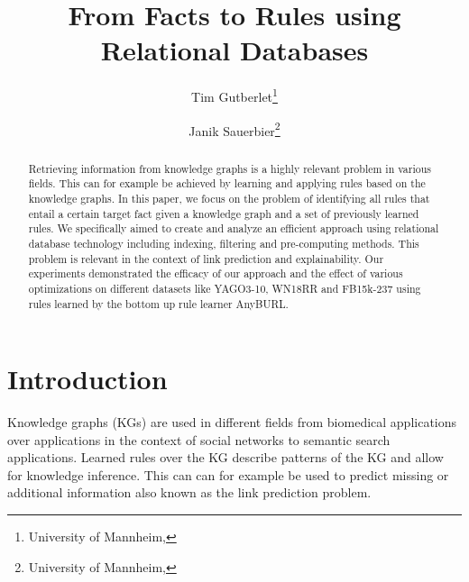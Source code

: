 \documentclass[english]{lni}
\begin{document}
\title[From Facts to Rules using Relational Databases]{From Facts to Rules using Relational Databases}
\author[Tim Gutberlet \and Janik Sauerbier]
{Tim Gutberlet\footnote{University of Mannheim, } \and
Janik Sauerbier\footnote{University of Mannheim, }}
\maketitle

\begin{abstract}
 Retrieving information from knowledge graphs is a highly relevant problem in various fields. This can for example be achieved by learning and applying rules based on the knowledge graphs. In this paper, we focus on the problem of identifying all rules that entail a certain target fact given a knowledge graph and a set of previously learned rules. We specifically aimed to create and analyze an efficient approach using relational database technology including indexing, filtering and pre-computing methods. This problem is relevant in the context of link prediction and explainability. Our experiments demonstrated the efficacy of our approach and the effect of various optimizations on different datasets like YAGO3-10, WN18RR and FB15k-237 using rules learned by the bottom up rule learner AnyBURL. 
\end{abstract}
\section{Introduction}
Knowledge graphs (KGs) are used in different fields from biomedical applications \cite{OpenBioLink} over applications in the context of social networks \cite{SocialNetworks} to semantic search applications\cite{SemanticSearch}. Learned rules over the KG describe patterns of the KG and allow for knowledge inference. This can can for example be used to predict missing or additional information also known as the link prediction problem.
\end{document}
